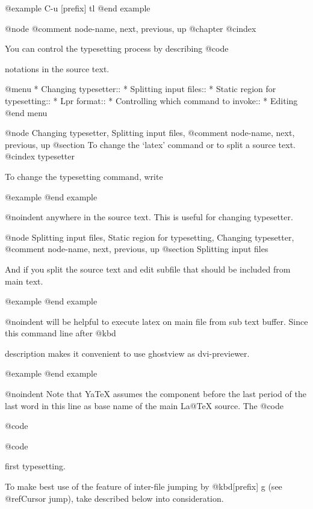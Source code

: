 {{{@example
        C-u [prefix] tl
@end example

@node %
@comment  node-name,  next,  previous,  up
@chapter %
@cindex %

  You can control the typesetting process by describing @code{%
notations in the source text.

@menu
* Changing typesetter::         
* Splitting input files::       
* Static region for typesetting::  
* Lpr format::                  
* Controlling which command to invoke::  
* Editing %
@end menu

@node Changing typesetter, Splitting input files, %
@comment  node-name,  next,  previous,  up
@section To change the `latex' command or to split a source text.
@cindex typesetter

  To change the typesetting command, write

@example
@end example

@noindent
anywhere in the source text.  This is useful for changing
typesetter.

@node Splitting input files, Static region for typesetting, Changing typesetter, %
@comment  node-name,  next,  previous,  up
@section Splitting input files

  And if you split the source text and
edit subfile that should be included from main text.

@example
@end example

@noindent
will be helpful to execute latex on main file from sub text buffer.  Since
this command line after @kbd{%
description makes it convenient to use ghostview as dvi-previewer.

@example
@end example

@noindent
Note that YaTeX  assumes the component  before the  last period of
the last word in this line as base name of the main La@TeX{} source.
The @code{%
@code{%
@code{%
first typesetting.

  To make best use of the feature of inter-file jumping by
@kbd{[prefix] g} (see @ref{Cursor jump}), take described below into
consideration.

}}}}}}}}

